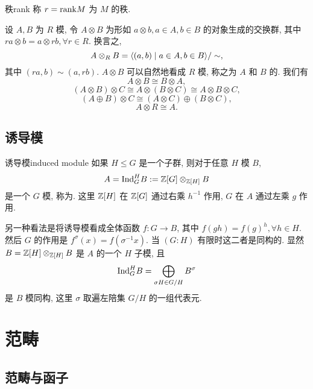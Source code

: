 \begin{definition}{秩}{rank}
称 $r={\mathrm{rank}} M$ 为 $M$ 的秩.
\end{definition}

\begin{example}
设 $A,B$ 为 $R$ 模, 令 $A\otimes B$ 为形如 $a\otimes b, a\in A, b\in B$ 的对象生成的交换群, 其中 $ra\otimes b=a\otimes rb, \forall r\in R$. 换言之,
  \[A\otimes_R B=\langle{(a,b)\mid a\in A,b\in B}\rangle/\sim,\]
其中 $(ra,b)\sim (a,rb)$. $A\otimes B$ 可以自然地看成 $R$ 模, 称之为 $A$ 和 $B$ 的. 我们有
  \[A\otimes B\cong B\otimes A,\]
  \[(A\otimes B)\otimes C\cong A\otimes(B\otimes C)\cong A\otimes B\otimes C,\]
  \[(A\oplus B)\otimes C\cong (A\otimes C)\oplus(B\otimes C),\]
  \[A\otimes R\cong A.\]
\end{example}

\subsection{诱导模}

\begin{definition}{诱导模}{induced module}
如果 $H\leqslant G$ 是一个子群, 则对于任意 $H$ 模 $B$,
  \[A={\mathrm{Ind}}_G^H B:={\mathbb{Z}}[G]\otimes_{{\mathbb{Z}}[H]} B\] 
是一个 $G$ 模, 称为. 这里 ${\mathbb{Z}}[H]$ 在 ${\mathbb{Z}}[G]$ 通过右乘 $h^{-1}$ 作用, $G$ 在 $A$ 通过左乘 $g$ 作用.

另一种看法是将诱导模看成全体函数 $f:G\to B$, 其中 $f(gh)=f(g)^h,\forall h\in H$. 然后 $G$ 的作用是 $f^\sigma(x)=f(\sigma^{-1} x)$. 当 $(G:H)$ 有限时这二者是同构的. 显然 $B={\mathbb{Z}}[H]\otimes_{{\mathbb{Z}}[H]} B$ 是 $A$ 的一个 $H$ 子模, 且
  \[{\mathrm{Ind}}_G^H B=\bigoplus_{\sigma H\in G/H} B^\sigma\]
是 $B$ 模同构, 这里 $\sigma$ 取遍左陪集 $G/H$ 的一组代表元.
\end{definition}


\section{范畴}

\subsection{范畴与函子}\label{subsec:categories_and_functors}

